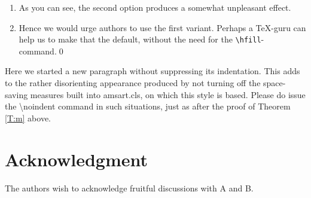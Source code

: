 \documentclass{lmcs} %
\theoremstyle{plain}\newtheorem{satz}[thm]{Satz} %
\begin{document}
\proof %
\begin{enumerate}%
\item
  As you can see, the second option produces a somewhat unpleasant effect.
\item
  Hence we would urge authors to use the first variant.  Perhaps a
  \TeX-guru can help us to make that the default, without the need for
  the \texttt{\textbackslash hfill}-command.\qed
\end{enumerate}

  Here we started a new paragraph without suppressing its
  indentation.  This adds to the rather disorienting appearance
  produced by not turning off the space-saving measures built into
  amsart.cls, on which this style is based.  Please do issue the
  \hbox{\textbackslash noindent} command in such situations, just as
  after the proof of Theorem \ref{T:m} above.

\section*{Acknowledgment}
  \noindent The authors wish to acknowledge fruitful discussions with
  A and B.


\nocite{*}




\appendix
\end{document}
